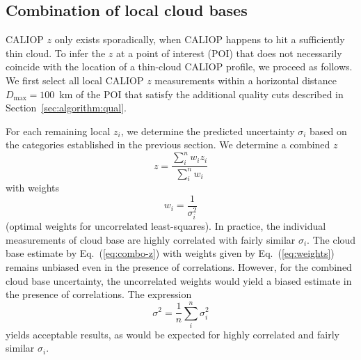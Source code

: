 \documentclass[essd,manuscript]{copernicus}\usepackage[]{graphicx}\usepackage[]{color}
\newcommand{\hlnum}[1]{\textcolor[rgb]{0.686,0.059,0.569}{#1}}%
\newcommand\comment[2]{\{\hlnum{ \textit{#1}: #2}\}}
\newcommand\commentjm[1]{\comment{$j_\mu$}{#1}}
\newcommand\CBH{\ensuremath{z}}
\begin{document}
\subsection{Combination of local cloud bases}
\label{sec:algorithm:combination}
CALIOP \CBH{} only exists sporadically, %
when CALIOP happens to hit a sufficiently thin cloud.  To infer the \CBH{} at a
point of interest (POI) that does not necessarily coincide with the location of
a thin-cloud CALIOP profile, we proceed as follows.  We first select all local
CALIOP \CBH{} measurements within a horizontal distance $D_\text{max} = 100$~km of
the POI that satisfy the additional quality cuts described in
Section~\ref{sec:algorithm:qual}. 

For each remaining local $\CBH{}_i$, we determine the predicted
uncertainty $\sigma_i$ based on the categories established in the previous
section.  We determine a combined \CBH{}
\begin{equation}
  \label{eq:combo-z}
  \CBH = \frac{\sum\limits_i^n w_i z_i}{\sum\limits_i^n w_i}
\end{equation}
with weights
\begin{equation}
  \label{eq:weights}
  w_i = \frac 1 {\sigma_i^2}
\end{equation}
(optimal weights for uncorrelated least-squares).  In practice, the individual
measurements of cloud base are highly correlated with fairly similar
$\sigma_i$.  The cloud base estimate by Eq.~(\ref{eq:combo-z}) with weights
given by Eq.~(\ref{eq:weights}) remains unbiased even in the presence of
correlations.  However, for the combined cloud base uncertainty,
the uncorrelated weights would yield a biased estimate in the presence of
correlations.  The expression
\begin{equation}
  \label{eq:combo-sigma}
  \sigma^2 = \frac 1 n \sum\limits_i^n \sigma_i^2
\end{equation}
yields acceptable results, as would be expected for highly correlated and fairly
similar $\sigma_i$.  

\end{document}
